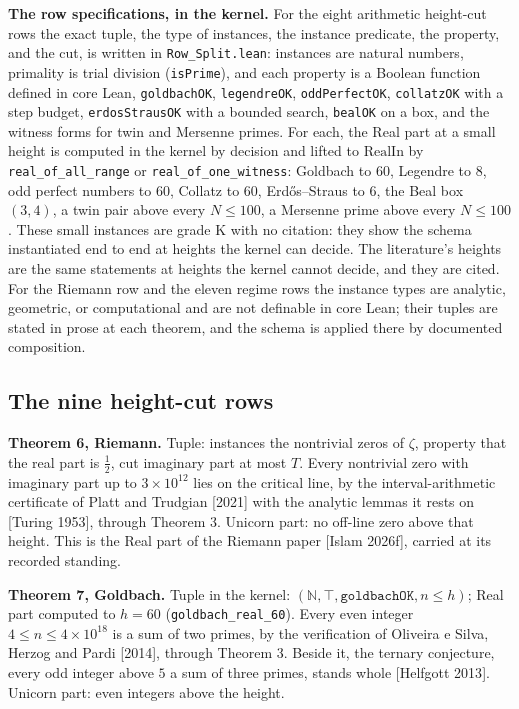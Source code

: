 \documentclass[10pt,twocolumn]{article}
\begin{document}
\textbf{The row specifications, in the kernel.} For the eight arithmetic
height-cut rows the exact tuple, the type of instances, the instance
predicate, the property, and the cut, is written in
\texttt{Row\_Split.lean}: instances are natural numbers, primality is
trial division (\texttt{isPrime}), and each property is a Boolean
function defined in core Lean, \texttt{goldbachOK}, \texttt{legendreOK},
\texttt{oddPerfectOK}, \texttt{collatzOK} with a step budget,
\texttt{erdosStrausOK} with a bounded search, \texttt{bealOK} on a box,
and the witness forms for twin and Mersenne primes. For each, the Real
part at a small height is computed in the kernel by decision and lifted
to \(\mathrm{RealIn}\) by \texttt{real\_of\_all\_range} or
\texttt{real\_of\_one\_witness}: Goldbach to \(60\), Legendre to \(8\),
odd perfect numbers to \(60\), Collatz to \(60\), Erdős--Straus to
\(6\), the Beal box \((3, 4)\), a twin pair above every \(N \le 100\), a
Mersenne prime above every \(N \le 100\). These small instances are
grade K with no citation: they show the schema instantiated end to end
at heights the kernel can decide. The literature's heights are the same
statements at heights the kernel cannot decide, and they are cited. For
the Riemann row and the eleven regime rows the instance types are
analytic, geometric, or computational and are not definable in core
Lean; their tuples are stated in prose at each theorem, and the schema
is applied there by documented composition.

\hypertarget{the-nine-height-cut-rows}{%
\subsection{The nine height-cut rows}\label{the-nine-height-cut-rows}}

\textbf{Theorem 6, Riemann.} Tuple: instances the nontrivial zeros of
\(\zeta\), property that the real part is \(\tfrac12\), cut imaginary
part at most \(T\). Every nontrivial zero with imaginary part up to
\(3 \times 10^{12}\) lies on the critical line, by the
interval-arithmetic certificate of Platt and Trudgian {[}2021{]} with
the analytic lemmas it rests on {[}Turing 1953{]}, through Theorem 3.
Unicorn part: no off-line zero above that height. This is the Real part
of the Riemann paper {[}Islam 2026f{]}, carried at its recorded
standing.

\textbf{Theorem 7, Goldbach.} Tuple in the kernel:
\((\mathbb{N}, \top, \texttt{goldbachOK}, n \le h)\); Real part computed
to \(h = 60\) (\texttt{goldbach\_real\_60}). Every even integer
\(4 \le n \le 4 \times 10^{18}\) is a sum of two primes, by the
verification of Oliveira e Silva, Herzog and Pardi {[}2014{]}, through
Theorem 3. Beside it, the ternary conjecture, every odd integer above
\(5\) a sum of three primes, stands whole {[}Helfgott 2013{]}. Unicorn
part: even integers above the height.
\end{document}
